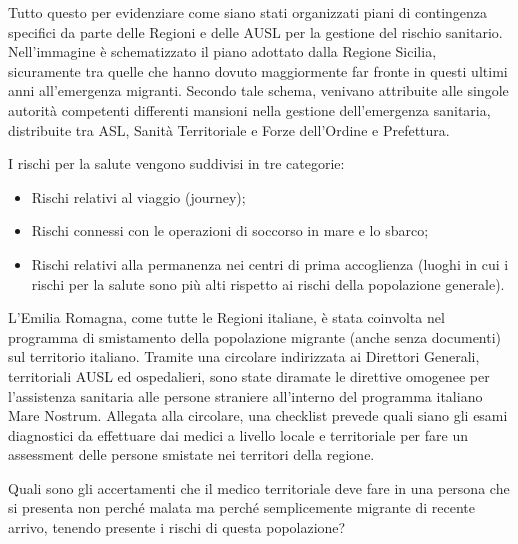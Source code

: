 Tutto questo per evidenziare come siano stati organizzati piani di
contingenza specifici da parte delle Regioni e delle AUSL per la
gestione del rischio sanitario. Nell'immagine è schematizzato il piano
adottato dalla Regione Sicilia, sicuramente tra quelle che hanno dovuto
maggiormente far fronte in questi ultimi anni all'emergenza migranti.
Secondo tale schema, venivano attribuite alle singole autorità
competenti differenti mansioni nella gestione dell'emergenza sanitaria,
distribuite tra ASL, Sanità Territoriale e Forze dell'Ordine e
Prefettura.

I rischi per la salute vengono suddivisi in tre categorie:

\begin{itemize}
\item
  Rischi relativi al viaggio (journey);
\item
  Rischi connessi con le operazioni di soccorso in mare e lo sbarco;
\item
  Rischi relativi alla permanenza nei centri di prima accoglienza
  (luoghi in cui i rischi per la salute sono più alti rispetto ai rischi
  della popolazione generale).
\end{itemize}

L'Emilia Romagna, come tutte le Regioni italiane, è stata coinvolta nel
programma di smistamento della popolazione migrante (anche senza
documenti) sul territorio italiano. Tramite una circolare indirizzata ai
Direttori Generali, territoriali AUSL ed ospedalieri, sono state
diramate le direttive omogenee per l'assistenza sanitaria alle persone
straniere all'interno del programma italiano Mare Nostrum. Allegata alla
circolare, una checklist prevede quali siano gli esami diagnostici da
effettuare dai medici a livello locale e territoriale per fare un
assessment delle persone smistate nei territori della regione.

Quali sono gli accertamenti che il medico territoriale deve fare in una
persona che si presenta non perché malata ma perché semplicemente
migrante di recente arrivo, tenendo presente i rischi di questa
popolazione?

